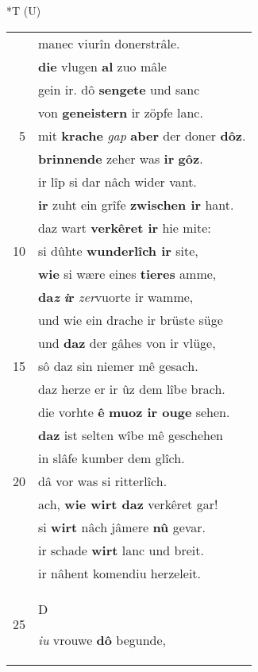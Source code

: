 \documentclass[8pt,a4paper,notitlepage]{article}
\begin{document}
\begin{table}[ht]
\begin{minipage}[t]{0.5\linewidth}
\end{minipage}
\hspace{0.5cm}
\begin{minipage}[t]{0.5\linewidth}
\small
\begin{center}*T (U)
\end{center}
\begin{tabular}{rl}
 & manec viurîn donerstrâle.\\ 
 & \textbf{die} vlugen \textbf{al} zuo mâle\\ 
 & gein ir. dô \textbf{sengete} und sanc\\ 
 & von \textbf{geneistern} ir zöpfe lanc.\\ 
5 & mit \textbf{krache} \textit{gap} \textbf{aber} der doner \textbf{dôz}.\\ 
 & \textbf{brinnende} zeher was \textbf{ir} \textbf{gôz}.\\ 
 & ir lîp si dar nâch wider vant.\\ 
 & \textbf{ir} zuht ein grîfe \textbf{zwischen ir} hant.\\ 
 & daz wart \textbf{verkêret ir} hie mite:\\ 
10 & si dûhte \textbf{wunderlîch ir} site,\\ 
 & \textbf{wie} si wære eines \textbf{tieres} amme,\\ 
 & \textbf{da\textit{z}} \textbf{\textit{i}r} \textit{zer}vuorte ir wamme,\\ 
 & und wie ein drache ir brüste süge\\ 
 & und \textbf{daz} der gâhes von ir vlüge,\\ 
15 & sô daz sin niemer mê gesach.\\ 
 & daz herze er ir ûz dem lîbe brach.\\ 
 & die vorhte \textbf{ê} \textbf{muoz ir ouge} sehen.\\ 
 & \textbf{daz} ist selten wîbe mê geschehen\\ 
 & in slâfe kumber dem glîch.\\ 
20 & dâ vor was si ritterlîch.\\ 
 & ach, \textbf{wie wirt daz} verkêret gar!\\ 
 & si \textbf{wirt} nâch jâmere \textbf{nû} gevar.\\ 
 & ir schade \textbf{wirt} lanc und breit.\\ 
 & ir nâhent komendiu herzeleit.\\ 
25 & \begin{large}D\end{large}\textit{iu} vrouwe \textbf{dô} begunde,\\ 

\end{tabular}
\end{minipage}
\end{table}
\end{document}
